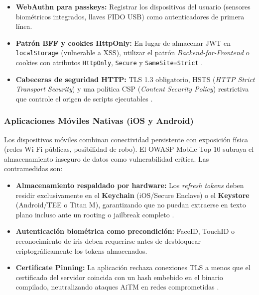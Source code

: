 \documentclass[12pt, a4paper]{article}
\begin{document}
\begin{itemize}[noitemsep]
  \item \textbf{WebAuthn para passkeys:} Registrar los dispositivos del usuario
        (sensores biométricos integrados, llaves FIDO USB) como autenticadores
        de primera línea.
  \item \textbf{Patrón BFF y cookies HttpOnly:} En lugar de almacenar JWT en
        \texttt{localStorage} (vulnerable a XSS), utilizar el patrón
        \textit{Backend-for-Frontend} o cookies con atributos
        \texttt{HttpOnly}, \texttt{Secure} y \texttt{SameSite=Strict}
        \cite{srivathsav2025}.
  \item \textbf{Cabeceras de seguridad HTTP:} TLS 1.3 obligatorio, HSTS
        (\textit{HTTP Strict Transport Security}) y una política CSP
        (\textit{Content Security Policy}) restrictiva que controle el origen
        de scripts ejecutables \cite{oligo2025}.
\end{itemize}

\subsubsection{Aplicaciones Móviles Nativas (iOS y Android)}

Los dispositivos móviles combinan conectividad persistente con exposición física
(redes Wi-Fi públicas, posibilidad de robo). El OWASP Mobile Top 10
\cite{owaspMobile} subraya el almacenamiento inseguro de datos como
vulnerabilidad crítica. Las contramedidas son:

\begin{itemize}[noitemsep]
  \item \textbf{Almacenamiento respaldado por hardware:} Los \textit{refresh
        tokens} deben residir exclusivamente en el \textbf{Keychain} (iOS/Secure
        Enclave) o el \textbf{Keystore} (Android/TEE o Titan M), garantizando
        que no puedan extraerse en texto plano incluso ante un rooting o
        jailbreak completo \cite{mdpi2025}.
  \item \textbf{Autenticación biométrica como precondición:} FaceID, TouchID o
        reconocimiento de iris deben requerirse antes de desbloquear
        criptográficamente los tokens almacenados.
  \item \textbf{Certificate Pinning:} La aplicación rechaza conexiones TLS a
        menos que el certificado del servidor coincida con un hash embebido en
        el binario compilado, neutralizando ataques AiTM en redes comprometidas
        \cite{mdpi2025,touchlane2025}.
\end{itemize}
\end{document}
